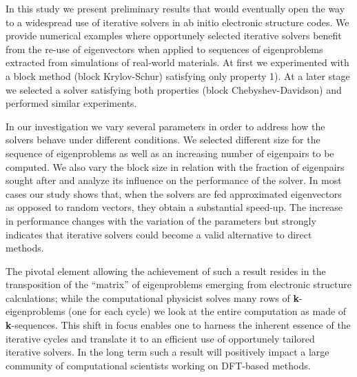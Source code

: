 \documentclass{report}
\begin{document}
In this study we present preliminary results that would eventually open
the way to a widespread use of iterative solvers in ab initio electronic
structure codes. We provide numerical examples where opportunely selected
iterative solvers benefit from the re-use of eigenvectors when applied to
sequences of eigenproblems extracted from simulations of real-world
materials. At first we experimented with a block method (block
Krylov-Schur) satisfying only property 1). At a later stage we selected a
solver satisfying both properties (block Chebyshev-Davidson) and
performed similar experiments.

In our investigation we vary several parameters in order to address how
the solvers behave under different conditions. We selected different size
for the sequence of eigenproblems as well as an increasing number of
eigenpairs to be computed. We also vary the block size in relation with
the fraction of eigenpairs sought after and analyze its influence on the
performance of the solver. In most cases our study shows that, when the
solvers are fed approximated eigenvectors as opposed to random vectors,
they obtain a substantial speed-up. The increase in performance changes
with the variation of the parameters but strongly indicates that
iterative solvers could become a valid alternative to direct methods.

The pivotal element allowing the achievement of such a result resides in
the transposition of the ``matrix'' of eigenproblems emerging from
electronic structure calculations; while the computational physicist
solves many rows of {\bf k}-eigenproblems (one for each cycle) we look at
the entire computation as made of {\bf k}-sequences. This shift in focus
enables one to harness the inherent essence of the iterative cycles and
translate it to an efficient use of opportunely tailored iterative
solvers. In the long term such a result will positively impact a large
community of computational scientists working on DFT-based methods.
\end{document}
